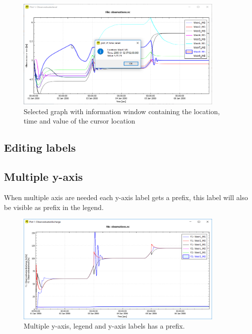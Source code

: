 \documentclass{deltares_memo}
\begin{document}
\begin{figure}[H]
    \centering    
    \includegraphics[width=0.9\textwidth]{pictures/plot_double_click_selected_graph.png}
    \caption{Selected graph with information window containing the location, time and value of the cursor location\label{fig:double_click_selected_graph}}
\end{figure}
\subsection{Editing labels}
\subsection{Multiple y-axis}
When multiple axis are needed each y-axis label gets a prefix, this label will also be visible as prefix in the legend.
\begin{figure}[H]
    \centering    
    \includegraphics[width=0.9\textwidth]{pictures/multiple_yaxis.png}
    \caption{Multiple y-axis, legend and y-axis labels has a prefix. \label{fig:multiple y-axis}}
\end{figure}
\end{document}
